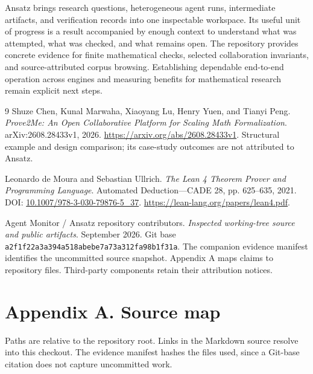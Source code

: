 \documentclass[11pt,a4paper]{article}
\begin{document}
Ansatz brings research questions, heterogeneous agent runs, intermediate artifacts, and verification records into one inspectable workspace. Its useful unit of progress is a result accompanied by enough context to understand what was attempted, what was checked, and what remains open. The repository provides concrete evidence for finite mathematical checks, selected collaboration invariants, and source-attributed corpus browsing. Establishing dependable end-to-end operation across engines and measuring benefits for mathematical research remain explicit next steps.


\begin{thebibliography}{9}
Shuze Chen, Kunal Marwaha, Xiaoyang Lu, Henry Yuen, and Tianyi Peng.
\newblock \emph{Prove2Me: An Open Collaborative Platform for Scaling Math Formalization}.
\newblock arXiv:2608.28433v1, 2026.
\newblock \url{https://arxiv.org/abs/2608.28433v1}.
\newblock Structural example and design comparison; its case-study outcomes
are not attributed to Ansatz.

Leonardo de Moura and Sebastian Ullrich.
\newblock \emph{The Lean 4 Theorem Prover and Programming Language}.
\newblock Automated Deduction---CADE 28, pp. 625--635, 2021.
\newblock DOI: \href{https://doi.org/10.1007/978-3-030-79876-5_37}
{10.1007/978-3-030-79876-5\_37}.
\newblock \url{https://lean-lang.org/papers/lean4.pdf}.

Agent Monitor / Ansatz repository contributors.
\newblock \emph{Inspected working-tree source and public artifacts}.
 September 2026. Git base
\nolinkurl{a2f1f22a3a394a518abebe7a73a312fa98b1f31a}.
\newblock The companion evidence manifest identifies the uncommitted source
snapshot. Appendix A maps claims to repository files.
Third-party components retain their attribution notices.
\end{thebibliography}


\clearpage

\section*{Appendix A. Source map}

Paths are relative to the repository root. Links in the Markdown source resolve into this checkout. The evidence manifest hashes the files used, since a Git-base citation does not capture uncommitted work.
\end{document}
